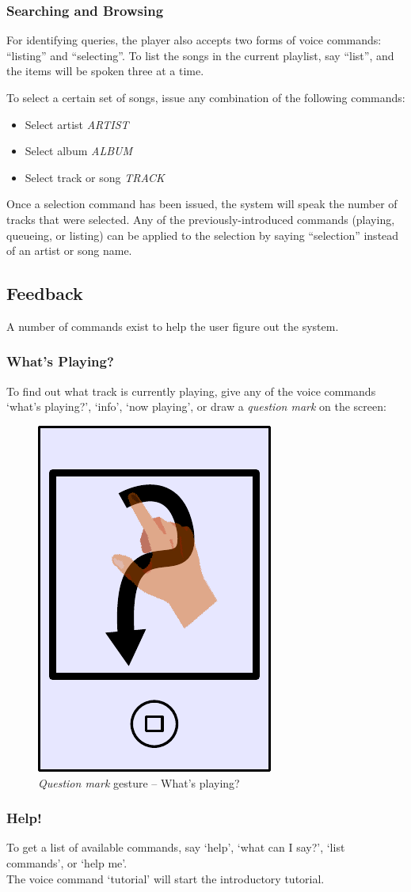 \documentclass[12pt,letterpaper]{article}
\begin{document}
\subsubsection*{{\color{blue} Searching and Browsing}}

For identifying queries, the player also accepts two forms of voice commands: ``listing'' and ``selecting''. To list the songs in the current playlist, say ``list'', and the items will be spoken three at a time.

To select a certain set of songs, issue any combination of the following commands:
	\begin{itemize}
	\item Select artist \textit{ARTIST}
	\item Select album \textit{ALBUM}
	\item Select track or song \textit{TRACK}
	\end{itemize}
Once a selection command has been issued, the system will speak the number of tracks that were selected. Any of the previously-introduced commands (playing, queueing, or listing) can be applied to the selection by saying ``selection'' instead of an artist or song name.

\subsection*{Feedback}

A number of commands exist to help the user figure out the system.

\subsubsection*{What's Playing?}

To find out what track is currently playing, give any of the voice commands `what's playing?', `info', `now playing',  or {\color{blue} draw a \emph{question mark} on the screen}:
\begin{figure}[H]
	\centering
	\includegraphics[scale=0.6]{question}
	\caption{\emph{Question mark} gesture -- What's playing?}
\end{figure}
\subsubsection*{Help!}
To get a list of available commands, say `help', `what can I say?', `list commands', or `help me'. \\
{\color{magenta}The voice command `tutorial' will start the introductory tutorial.}
\end{document}
